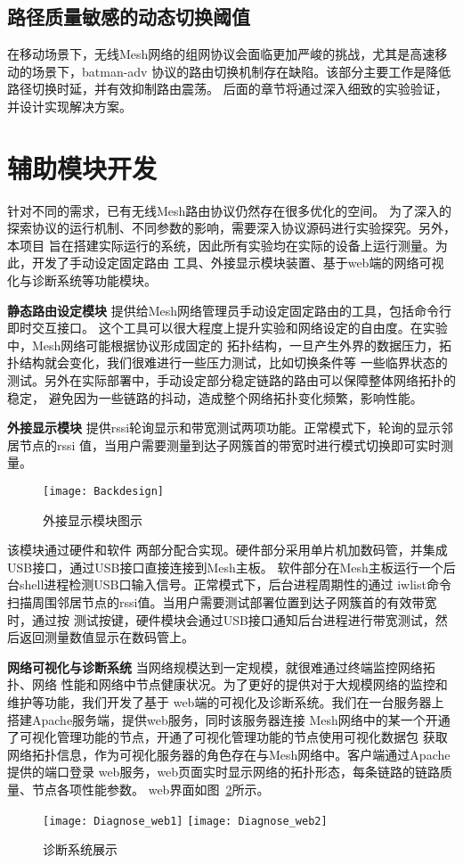 \subsection{路径质量敏感的动态切换阈值}
    在移动场景下，无线Mesh网络的组网协议会面临更加严峻的挑战，尤其是高速移动的场景下，batman-adv
协议的路由切换机制存在缺陷。该部分主要工作是降低路径切换时延，并有效抑制路由震荡。
后面的章节将通过深入细致的实验验证，并设计实现解决方案。

\section{辅助模块开发}
针对不同的需求，已有无线Mesh路由协议仍然存在很多优化的空间。
为了深入的探索协议的运行机制、不同参数的影响，需要深入协议源码进行实验探究。另外，本项目
旨在搭建实际运行的系统，因此所有实验均在实际的设备上运行测量。为此，开发了手动设定固定路由
工具、外接显示模块装置、基于web端的网络可视化与诊断系统等功能模块。

\textbf{静态路由设定模块} 提供给Mesh网络管理员手动设定固定路由的工具，包括命令行即时交互接口。
这个工具可以很大程度上提升实验和网络设定的自由度。在实验中，Mesh网络可能根据协议形成固定的
拓扑结构，一旦产生外界的数据压力，拓扑结构就会变化，我们很难进行一些压力测试，比如切换条件等
一些临界状态的测试。另外在实际部署中，手动设定部分稳定链路的路由可以保障整体网络拓扑的稳定，
避免因为一些链路的抖动，造成整个网络拓扑变化频繁，影响性能。

\textbf{外接显示模块} 提供rssi轮询显示和带宽测试两项功能。正常模式下，轮询的显示邻居节点的rssi
值，当用户需要测量到达子网簇首的带宽时进行模式切换即可实时测量。

\begin{figure}[H]
  \centering
  \texttt{[image: Backdesign]}
  \caption{外接显示模块图示}
  \label{fig:backdesign}
\end{figure}

该模块通过硬件和软件
两部分配合实现。硬件部分采用单片机加数码管，并集成USB接口，通过USB接口直接连接到Mesh主板。
软件部分在Mesh主板运行一个后台shell进程检测USB口输入信号。正常模式下，后台进程周期性的通过
iwlist命令扫描周围邻居节点的rssi值。当用户需要测试部署位置到达子网簇首的有效带宽时，通过按
测试按键，硬件模块会通过USB接口通知后台进程进行带宽测试，然后返回测量数值显示在数码管上。

\textbf{网络可视化与诊断系统} 当网络规模达到一定规模，就很难通过终端监控网络拓扑、网络
性能和网络中节点健康状况。为了更好的提供对于大规模网络的监控和维护等功能，我们开发了基于
web端的可视化及诊断系统。我们在一台服务器上搭建Apache服务端，提供web服务，同时该服务器连接
Mesh网络中的某一个开通了可视化管理功能的节点，开通了可视化管理功能的节点使用可视化数据包
获取网络拓扑信息，作为可视化服务器的角色存在与Mesh网络中。客户端通过Apache提供的端口登录
web服务，web页面实时显示网络的拓扑形态，每条链路的链路质量、节点各项性能参数。
web界面如图~\ref{fig:diagnose_web}所示。

\begin{figure}[h]
  \centering
  \subcaptionbox{}
      {\texttt{[image: Diagnose\_web1]}}
  \hspace{1em}
  \subcaptionbox{}
    {\texttt{[image: Diagnose\_web2]}}
  \caption{诊断系统展示}
  \label{fig:diagnose_web}
\end{figure}













